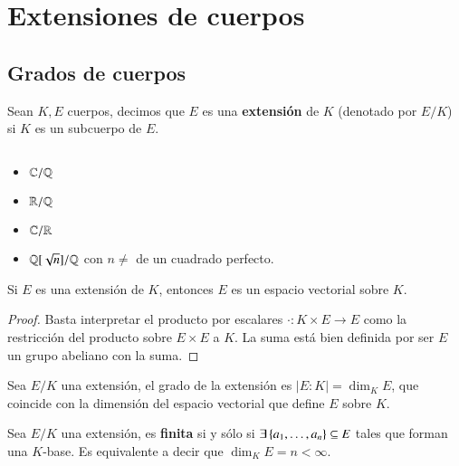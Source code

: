 
\chapter{Extensiones de cuerpos}

\section{Grados de cuerpos}

\begin{dfn}[Extensión]
    Sean $K, E$ cuerpos, decimos que $E$ es una \textbf{extensión} de $K$ (denotado por $E/K$) si $K$ es un subcuerpo de $E$.
\end{dfn}

\begin{eg}[Extensiones]$ $
    \begin{itemize}
        \item $\mathbb{C}/\mathbb{Q}$
        \item $\mathbb{R}/\mathbb{Q}$
        \item $\mathbb{C}/\mathbb{R}$
        \item $\mathbb{Q}[\sqrt{n}]/\mathbb{Q}$ con $n \neq$ de un cuadrado perfecto.
    \end{itemize}
\end{eg}

\begin{pro}
    Si $E$ es una extensión de $K$, entonces $E$ es un espacio vectorial sobre $K$.
\end{pro}
\begin{proof}
    Basta interpretar el producto por escalares $\cdot: K \times E \to E$ como la restricción del producto sobre $E \times E$ a $K$. La suma está bien definida por ser $E$ un grupo abeliano con la suma.
\end{proof}

\begin{dfn}
    Sea $E/K$ una extensión, el grado de la extensión es $|E:K| = \dim_K E$, que coincide con la dimensión del espacio vectorial que define $E$ sobre $K$.
\end{dfn}

\begin{dfn}
    Sea $E/K$ una extensión, es \textbf{finita} si y sólo si $\exists \left\{a_1, \ldots, a_n\right\} \subseteq E$ tales que forman una $K$-base. Es equivalente a decir que $\dim_K E = n < \infty$.
\end{dfn}

